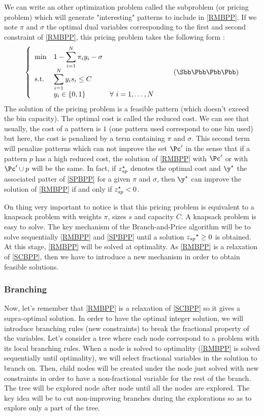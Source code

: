We can write an other optimization problem called the subproblem (or pricing problem) which will generate "interesting" patterns to include in \eqref{RMBPP}. If we note $\pi$ and $\sigma$ the optimal dual variables corresponding to the first and second constraint of \eqref{RMBPP}, this pricing problem takes the following form :
\begin{equation}
	\label{SPBPP}
		\left \{
		\begin{array}{*5{>{\displaystyle}l}}
		\min & 1-\sum_{i=1}^{N} \pi_i y_i - \sigma \\
		\st & \sum_{i=1}^{N} y_i s_i \leq C \\
		& y_i \in \{0,1\} &  \forall \ i = 1,\dots,N
		\end{array}
		\right.
	\tag{$\Sbb\Pbb\Bbb\Pbb\Pbb$}
\end{equation}
The solution of the pricing problem is a feasible pattern (\ie which doesn't exceed the bin capacity). The optimal cost is called the reduced cost. We can see that usually, the cost of a pattern is $1$ (one pattern used correspond to one bin used) but here, the cost is penalized by a term containing $\pi$ and $\sigma$. This second term will penalize patterns which can not improve the set $\Pc'$ in the sense that if a pattern $p$ has a high reduced cost, the solution of \eqref{RMBPP} with $\Pc'$ or with $\Pc' \cup p$ will be the same. In fact, if ${z}^{\star}_{sp}$ denotes the optimal cost and $\opt{\y}$ the associated patter of \eqref{SPBPP} for a given $\pi$ and $\sigma$, then $\opt{\y}$ can improve the solution of \eqref{RMBPP}
if and only if ${z}^{\star}_{sp}<0$.

On thing very important to notice is that this pricing problem is equivalent to a knapsack problem with weights $\pi$, sizes $s$ and capacity $C$. A knapsack problem is easy to solve. The key mechanism of the Branch-and-Price algorithm will be to solve sequentially \eqref{RMBPP} and \eqref{SPBPP} until a solution ${z_{sp}}^{\star} \geq 0$ is obtained. At this stage, \eqref{RMBPP} will be solved at optimality. As \eqref{RMBPP} is a relaxation of \eqref{SCBPP}, then we have to introduce a new mechanism in order to obtain feasible solutions.

\subsubsection{Branching}

Now, let's remember that \eqref{RMBPP} is a relaxation of \eqref{SCBPP} so it gives a supra-optimal solution. In order to have the optimal integer solution, we will introduce branching rules (new constraints) to break the fractional property of the variables. Let's consider a tree where each node correspond to a problem with its local branching rules. When a node is solved to optimality (\ie \eqref{RMBPP} is solved sequentially until optimality), we will select fractional variables in the solution to branch on. Then, child nodes will be created under the node just solved with new constraints in order to have a non-fractional variable for the rest of the branch. The tree will be explored node after node until all the nodes are explored. The key idea will be to cut non-improving branches during the explorations so as to explore only a part of the tree.

